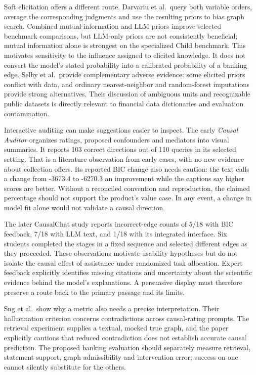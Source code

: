 Soft elicitation offers a different route. Darvariu et al.~query both
variable orders, average the corresponding judgments and use the
resulting priors to bias graph search. Combined mutual-information and
LLM priors improve selected benchmark comparisons, but LLM-only priors
are not consistently beneficial; mutual information alone is strongest
on the specialized Child benchmark. This motivates sensitivity to the
influence assigned to elicited knowledge. It does not convert the
model's stated probability into a calibrated probability of a banking
edge. Selby et al.~provide complementary adverse evidence: some elicited
priors conflict with data, and ordinary nearest-neighbor and
random-forest imputations provide strong alternatives. Their discussion
of ambiguous units and recognizable public datasets is directly relevant
to financial data dictionaries and evaluation contamination.
\citep{v12_la_2405_13551,v12_la_2402_07770}

Interactive auditing can make suggestions easier to inspect. The early
\emph{Causal Auditor} organizes ratings, proposed confounders and
mediators into visual summaries. It reports 103 correct directions out
of 110 queries in its selected setting. That is a literature observation
from early cases, with no new evidence about collection offers. Its
reported BIC change also needs caution: the text calls a change from
-3673.4 to -6270.3 an improvement while the captions say higher scores
are better. Without a reconciled convention and reproduction, the
claimed percentage should not support the product's value case. In any
event, a change in model fit alone would not validate a causal
direction. \citep{exec14_expert_auditor}

The later CausalChat study reports incorrect-edge counts of 5/18 with
BIC feedback, 7/18 with LLM text, and 1/18 with its integrated
interface. Six students completed the stages in a fixed sequence and
selected different edges as they proceeded. These observations motivate
usability hypotheses but do not isolate the causal effect of assistance
under randomized task allocation. Expert feedback explicitly identifies
missing citations and uncertainty about the scientific evidence behind
the model's explanations. A persuasive display must therefore preserve a
route back to the primary passage and its limits.
\citep{v12_la_2410_14146}

Sng et al.~show why a metric also needs a precise interpretation. Their
hallucination criterion concerns contradictions across causal-rating
prompts. The retrieval experiment supplies a textual, mocked true graph,
and the paper explicitly cautions that reduced contradiction does not
establish accurate causal prediction. The proposed banking evaluation
should separately measure retrieval, statement support, graph
admissibility and intervention error; success on one cannot silently
substitute for the others. \citep{exec13_hallucination}


